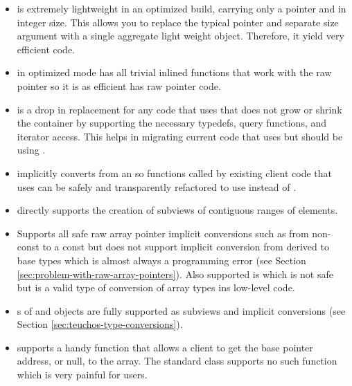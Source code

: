 \documentclass[pdf,ps2pdf,11pt]{SANDreport}
\begin{document}
\begin{itemize}

{}\item{}{} is extremely lightweight in an optimized
build, carrying only a pointer and in integer size.  This allows you
to replace the typical pointer and separate size argument with a
single aggregate light weight object.  Therefore, it yield very
efficient code.

{}\item{} in optimized mode has all trivial inlined
functions that work with the raw pointer so it is as efficient has raw
pointer code.

{}\item{}{} is a drop in replacement for any code
that uses {} that does not grow or shrink the
container by supporting the necessary typedefs, query functions, and
iterator access.  This helps in migrating current code that uses
{} but should be using {}.

{}\item{}{} implicitly converts from an
{} so functions called by existing client code
that uses {} can be safely and transparently
refactored to use {} instead of
{}.

{}\item{} directly supports the creation of subviews
of contiguous ranges of elements.

{}\item{} Supports all safe raw array pointer
implicit conversions such as from non-const to a const but does not
support implicit conversion from derived to base types which is almost
always a programming error (see Section
{}\ref{sec:problem-with-raw-array-pointers}).  Also supported is
{} which is not safe but is a valid type of
conversion of array types ins low-level code.

{}\item{}s of {} and
{} objects are fully supported as subviews and
implicit conversions (see Section
{}\ref{sec:teuchos-type-conversions}).

{}\item{} supports a handy {}
function that allows a client to get the base pointer address, or
null, to the array.  The standard {} class
supports no such function which is very painful for users.

\end{itemize}
\end{document}
